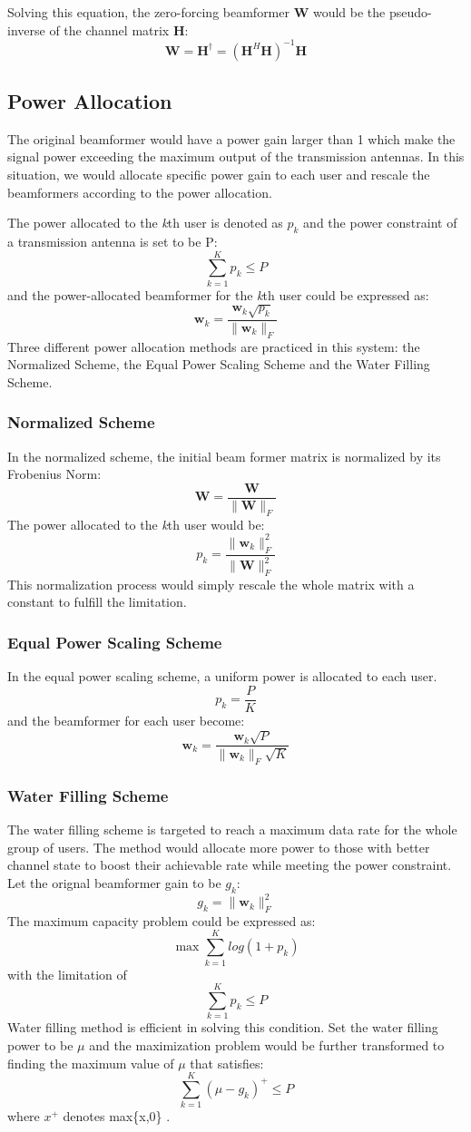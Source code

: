 \documentclass{article}
\begin{document}
\noindent
Solving this equation, the zero-forcing beamformer \textbf{W} would be the pseudo-inverse of the channel matrix \textbf{H}:
\[
\textbf{W} = \textbf{H}^{\dagger} = (\textbf{H}^H\textbf{H})^{-1}\textbf{H}
\]

\subsection{Power Allocation}
The original beamformer would have a power gain larger than 1 which make the signal power exceeding the maximum output of the transmission antennas.
In this situation, we would allocate specific power gain to each user and rescale the beamformers according to the power allocation.

\noindent
The power allocated to the \textit{k}th user is denoted as $p_k$ and the power constraint of a transmission antenna is set to be P:
\[\sum_{k=1}^K p_k \leq P\]
and the power-allocated beamformer for the \textit{k}th user could be expressed as:
\[\textbf{w}_k = \frac{\textbf{w}_k\sqrt{p_k}}{\lVert \textbf{w}_k \rVert_{F}}\]
Three different power allocation methods are practiced in this system:
the Normalized Scheme, the Equal Power Scaling Scheme and the Water Filling Scheme.
\subsubsection{Normalized Scheme}
In the normalized scheme, the initial beam former matrix is normalized by its Frobenius Norm:
\[
\textbf{W} = \frac{\textbf{W}}{\lVert \textbf{W} \rVert_{F}}
\]
The power allocated to the \textit{k}th user would be:
\[p_k = \frac{\lVert \textbf{w}_k \rVert_{F}^2}{\lVert \textbf{W} \rVert_{F}^2}\]
This normalization process would simply rescale the whole matrix with a constant to fulfill the limitation.

\subsubsection{Equal Power Scaling Scheme}
In the equal power scaling scheme, a uniform power is allocated to each user.
\[p_k = \frac{P}{K}\]
and the beamformer for each user become:
\[\textbf{w}_k = \frac{\textbf{w}_k\sqrt{P}}{\lVert \textbf{w}_k \rVert_{F}\sqrt{K}}\]
\subsubsection{Water Filling Scheme}
The water filling scheme is targeted to reach a maximum data rate for the whole group of users.
The method would allocate more power to those with better channel state to boost their achievable rate while meeting the power constraint.
Let the orignal beamformer gain to be $g_k$:
\[g_k = \lVert \textbf{w}_k \rVert_{F}^2\]
The maximum capacity problem could be expressed as:
\[
\max \sum_{k=1}^{K} log(1+p_k)
\]
with the limitation of
\[\sum_{k=1}^{K} p_k \leq P\]
Water filling method is efficient in solving this condition.
Set the water filling power to be $\mu$ and the maximization problem would be further transformed
to finding the maximum value of $\mu$ that satisfies:
\[\sum_{k=1}^{K}(\mu-g_k)^+ \leq P\]
where ${x}^+$ denotes max\{x,0\} \cite{TY1}.
\end{document}
